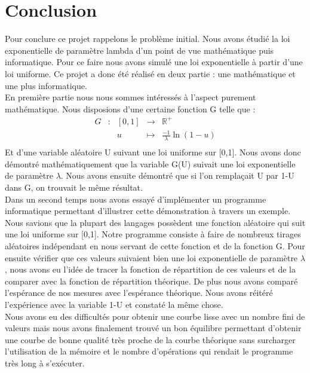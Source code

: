 \documentclass[12,french]{report}
\begin{document}
\chapter*{Conclusion}

Pour conclure ce projet rappelons le problème initial. Nous avons  étudié la loi exponentielle de paramètre lambda d'un point de vue mathématique puis informatique. Pour ce faire nous avons simulé une loi exponentielle à partir d'une loi uniforme. Ce projet a donc été réalisé en deux partie : une mathématique et une plus informatique.\\

En première partie nous nous sommes intéressés à l'aspect purement mathématique. Nous disposions d'une certaine fonction G telle que :
$$\begin{array}{ccccc}
	G & : & [0,1] & \longrightarrow & \mathbb{R}^{+} \\
	& & u & \longmapsto & \frac{-1}{\lambda}\ln(1-u) \\
\end{array}$$ 
Et d'une variable aléatoire U suivant une loi uniforme sur [0,1]. Nous avons donc démontré mathématiquement que la variable G(U) suivait une loi exponentielle de paramètre $\lambda$. Nous avons ensuite démontré que si l'on remplaçait U par 1-U dans G, on trouvait le même résultat.\\

Dans un second temps nous avons essayé d'implémenter un programme informatique permettant d'illustrer cette démonstration à travers un exemple. Nous savions que la plupart des langages possèdent une fonction aléatoire qui suit une loi uniforme sur [0,1]. Notre programme consiste à faire de nombreux tirages aléatoires indépendant en nous servant de cette fonction et de la fonction G. Pour ensuite vérifier que ces valeurs suivaient bien une loi exponentielle de paramètre $\lambda$, nous avons eu l'idée de tracer la fonction de répartition de ces valeurs et de la comparer avec la fonction de répartition théorique. De plus nous avons comparé l'espérance de nos mesures avec l'espérance théorique. Nous avons réitéré l'expérience avec la variable 1-U et constaté la même chose.\\

Nous avons eu des difficultés pour obtenir une courbe lisse avec un nombre fini de valeurs mais nous avons finalement trouvé un bon équilibre permettant d'obtenir une courbe de bonne qualité très proche de la courbe théorique sans surcharger l'utilisation de la mémoire et le nombre d'opérations qui rendait le programme très long à s'exécuter.\\
\end{document}
